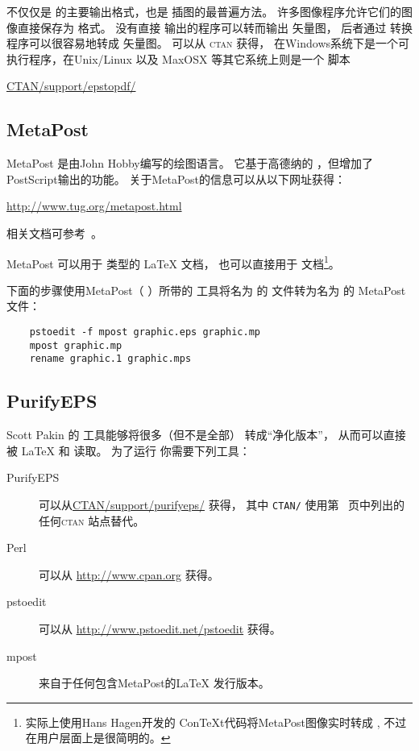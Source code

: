  不仅仅是 \pdfTeX{} 的主要输出格式，也是\pdfTeX{} 插图的最普遍方法。
许多图像程序允许它们的图像直接保存为  格式。
没有直接  输出的程序可以转而输出  矢量图，
后者通过  转换程序可以很容易地转成  矢量图。
 可以从 \textsc{ctan} 获得，
在Windows系统下是一个可执行程序，在Unix/Linux 以及 MaxOSX 等其它系统上则是一个 脚本
\begin{center}
\href{ftp://ctan.tug.org/tex-archive/support/epstopdf/}{CTAN/support/epstopdf/}
\end{center}

\subsection{MetaPost}\label{ssec:metapost}
MetaPost 是由John Hobby编写的绘图语言。
它基于高德纳的 ，但增加了PostScript输出的功能。
关于MetaPost的信息可以从以下网址获得：
\begin{center}
\url{http://www.tug.org/metapost.html}
\end{center}
相关文档可参考~\cite{metaPost-doc}。

MetaPost 可以用于  类型的 \LaTeX{} 文档，
也可以直接用于 \pdfLaTeX{} 文档\footnote{
	\pdfLaTeX{} 实际上使用Hans Hagen开发的 {Con\TeX t}代码将MetaPost图像实时转成 ,
	不过在用户层面上是很简明的。}。

下面的步骤使用MetaPost（  ）所带的  工具将名为  的  文件转为名为  的 MetaPost 文件：

\begin{verbatim}
	pstoedit -f mpost graphic.eps graphic.mp
	mpost graphic.mp
	rename graphic.1 graphic.mps
\end{verbatim}

\subsection{PurifyEPS}\label{ssec:purifyeps}
Scott Pakin 的  工具能够将很多（但不是全部）  转成“净化版本”，
从而可以直接被 \LaTeX{} 和 \pdfLaTeX{} 读取。
为了运行  你需要下列工具：
\begin{description}
	\item[PurifyEPS] 可以从\href{ftp://ctan.tug.org/tex-archive/support/purifyeps/}{CTAN/support/purifyeps/} 获得，
	其中 \texttt{CTAN/} 使用第~\pageref{ctan-sites} 页中列出的任何\textsc{ctan} 站点替代。
	\item[Perl] 可以从 \url{http://www.cpan.org} 获得。
	\item[pstoedit] 可以从 \url{http://www.pstoedit.net/pstoedit} 获得。
	\item[mpost] 来自于任何包含MetaPost的\LaTeX{} 发行版本。
\end{description}


